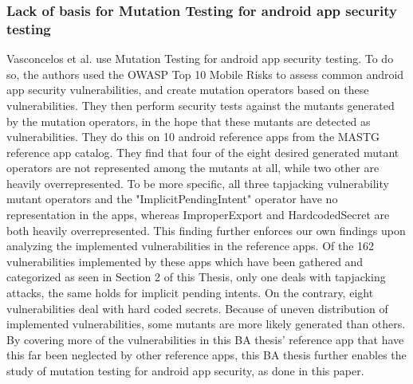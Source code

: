 \subsubsection{Lack of basis for Mutation Testing for android app security testing}
Vasconcelos et al. \citep{paper_10} use Mutation Testing for android app security testing. To do so, the authors used the OWASP Top 10 Mobile Risks to assess common android app security vulnerabilities, and create mutation operators based on these vulnerabilities. They then perform security tests against the mutants generated by the mutation operators, in the hope that these mutants are detected as vulnerabilities. They do this on  10 android reference apps from the MASTG reference app catalog. They find that four of the eight desired generated mutant operators are not represented among the mutants at all, while two other are heavily overrepresented. To be more specific, all three tapjacking vulnerability mutant operators and the "ImplicitPendingIntent" operator have no representation in the apps, whereas ImproperExport and HardcodedSecret are both heavily overrepresented. This finding further enforces our own findings upon analyzing the implemented vulnerabilities in the reference apps. Of the 162 vulnerabilities implemented by these apps which have been gathered and categorized as seen in Section 2 of this Thesis, only one deals with tapjacking attacks, the same holds for implicit pending intents. On the contrary, eight vulnerabilities deal with hard coded secrets. Because of uneven distribution of implemented vulnerabilities, some mutants are more likely generated than others.  By covering more of the vulnerabilities in this BA thesis' reference app that have this far been neglected by other reference apps, this BA thesis further enables the study of mutation testing for android app security, as done in this paper.

